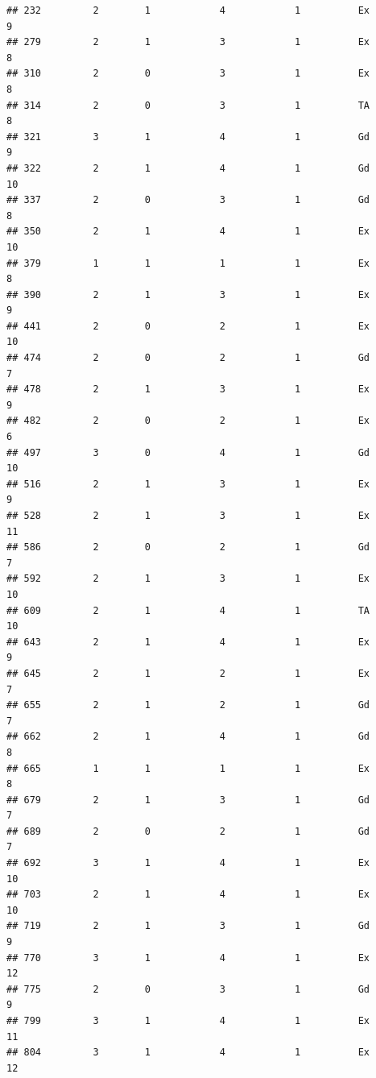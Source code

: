 \documentclass[]{article}
\begin{document}
\begin{verbatim}
## 232         2        1            4            1          Ex            9
## 279         2        1            3            1          Ex            8
## 310         2        0            3            1          Ex            8
## 314         2        0            3            1          TA            8
## 321         3        1            4            1          Gd            9
## 322         2        1            4            1          Gd           10
## 337         2        0            3            1          Gd            8
## 350         2        1            4            1          Ex           10
## 379         1        1            1            1          Ex            8
## 390         2        1            3            1          Ex            9
## 441         2        0            2            1          Ex           10
## 474         2        0            2            1          Gd            7
## 478         2        1            3            1          Ex            9
## 482         2        0            2            1          Ex            6
## 497         3        0            4            1          Gd           10
## 516         2        1            3            1          Ex            9
## 528         2        1            3            1          Ex           11
## 586         2        0            2            1          Gd            7
## 592         2        1            3            1          Ex           10
## 609         2        1            4            1          TA           10
## 643         2        1            4            1          Ex            9
## 645         2        1            2            1          Ex            7
## 655         2        1            2            1          Gd            7
## 662         2        1            4            1          Gd            8
## 665         1        1            1            1          Ex            8
## 679         2        1            3            1          Gd            7
## 689         2        0            2            1          Gd            7
## 692         3        1            4            1          Ex           10
## 703         2        1            4            1          Ex           10
## 719         2        1            3            1          Gd            9
## 770         3        1            4            1          Ex           12
## 775         2        0            3            1          Gd            9
## 799         3        1            4            1          Ex           11
## 804         3        1            4            1          Ex           12

\end{verbatim}
\end{document}
